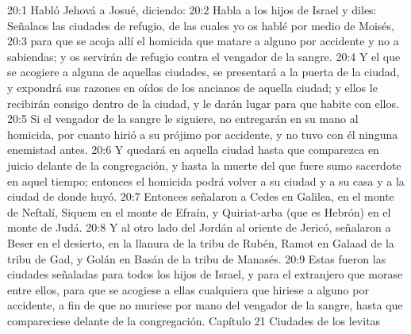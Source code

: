 20:1 Habló Jehová a Josué, diciendo:  
20:2 Habla a los hijos de Israel y diles: Señalaos las ciudades de refugio, de las cuales yo os hablé por medio de Moisés, 
20:3 para que se acoja allí el homicida que matare a alguno por accidente y no a sabiendas; y os servirán de refugio contra el vengador de la sangre.  
20:4 Y el que se acogiere a alguna de aquellas ciudades, se presentará a la puerta de la ciudad, y expondrá sus razones en oídos de los ancianos de aquella ciudad; y ellos le recibirán consigo dentro de la ciudad, y le darán lugar para que habite con ellos.  
20:5 Si el vengador de la sangre le siguiere, no entregarán en su mano al homicida, por cuanto hirió a su prójimo por accidente, y no tuvo con él ninguna enemistad antes.  
20:6 Y quedará en aquella ciudad hasta que comparezca en juicio delante de la congregación, y hasta la muerte del que fuere sumo sacerdote en aquel tiempo; entonces el homicida podrá volver a su ciudad y a su casa y a la ciudad de donde huyó.  
20:7 Entonces señalaron a Cedes en Galilea, en el monte de Neftalí, Siquem en el monte de Efraín, y Quiriat-arba (que es Hebrón) en el monte de Judá.  
20:8 Y al otro lado del Jordán al oriente de Jericó, señalaron a Beser en el desierto, en la llanura de la tribu de Rubén, Ramot en Galaad de la tribu de Gad, y Golán en Basán de la tribu de Manasés.  
20:9 Estas fueron las ciudades señaladas para todos los hijos de Israel, y para el extranjero que morase entre ellos, para que se acogiese a ellas cualquiera que hiriese a alguno por accidente, a fin de que no muriese por mano del vengador de la sangre, hasta que compareciese delante de la congregación.  
Capítulo 21
Ciudades de los levitas   

